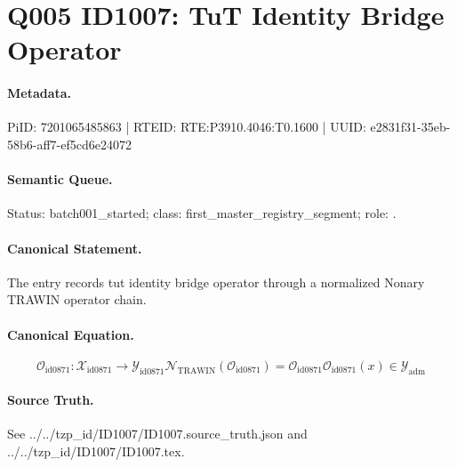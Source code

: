 \section*{Q005 ID1007: TuT Identity Bridge Operator}
\paragraph{Metadata.}
PiID: 7201065485863 | RTEID: RTE:P3910.4046:T0.1600 | UUID: e2831f31-35eb-58b6-aff7-ef5cd6e24072

\paragraph{Semantic Queue.}
Status: batch001\_started; class: first\_master\_registry\_segment; role: .

\paragraph{Canonical Statement.}
The entry records tut identity bridge operator through a normalized Nonary TRAWIN operator chain.

\paragraph{Canonical Equation.}
\[
\mathcal{O}_{\mathrm{id0871}}:\mathcal{X}_{\mathrm{id0871}}\longrightarrow\mathcal{Y}_{\mathrm{id0871}} \mathcal{N}_{\mathrm{TRAWIN}}(\mathcal{O}_{\mathrm{id0871}})=\mathcal{O}_{\mathrm{id0871}} \mathcal{O}_{\mathrm{id0871}}(x)\in\mathcal{Y}_{\mathrm{adm}}
\]

\paragraph{Source Truth.}
See ../../tzp\_id/ID1007/ID1007.source\_truth.json and ../../tzp\_id/ID1007/ID1007.tex.
